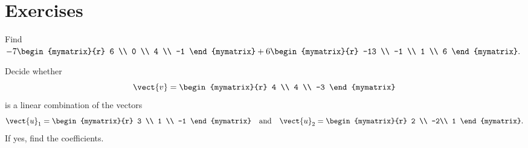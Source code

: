 \section*{Exercises}

\begin{enumialphparenastyle}

\begin{ex}
  Find $-7\begin{mymatrix}{r}
    6 \\
    0 \\
    4 \\
    -1
  \end{mymatrix} +6\begin{mymatrix}{r}
    -13 \\
    -1 \\
    1 \\
    6
  \end{mymatrix} .$ 
\end{ex}


\begin{ex}
  Decide whether 
  \begin{equation*}
    \vect{v}= \begin{mymatrix}{r}
      4 \\
      4 \\
      -3
    \end{mymatrix}
  \end{equation*}
  is a linear combination of the vectors 
  \begin{equation*}
    \vect{u}_1 = \begin{mymatrix}{r}
      3 \\
      1 \\
      -1
    \end{mymatrix}
    \quad\mbox{and}\quad
    \vect{u}_2 = 
    \begin{mymatrix}{r}
      2 \\
      -2\\
      1
    \end{mymatrix}.
  \end{equation*}
  If yes, find the coefficients.
  

\end{ex}
\end{enumialphparenastyle}
